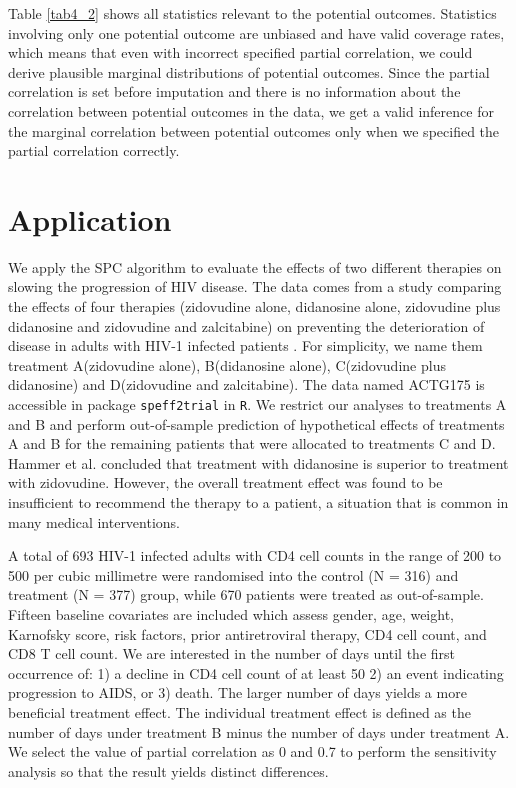 	Table \ref{tab4_2} shows all statistics relevant to the potential outcomes. Statistics involving only one potential outcome are unbiased and have valid coverage rates, which means that even with incorrect specified partial correlation, we could derive plausible marginal distributions of potential outcomes. Since the partial correlation is set before imputation and there is no information about the correlation between potential outcomes in the data, we get a valid inference for the marginal correlation between potential outcomes only when we specified the partial correlation correctly.    
	
	\section{Application}
	\label{sec:4.6}
	We apply the SPC algorithm to evaluate the effects of two different therapies on slowing the progression of HIV disease. The data comes from a study comparing the effects of four therapies (zidovudine alone, didanosine alone, zidovudine plus didanosine and zidovudine and zalcitabine) on preventing the deterioration of disease in adults with HIV-1 infected patients \citep{hammer1996trial}. For simplicity, we name them treatment A(zidovudine alone), B(didanosine alone), C(zidovudine plus didanosine) and D(zidovudine and zalcitabine). The data named ACTG175 is accessible in package \texttt{speff2trial} in \texttt{R}. We restrict our analyses to treatments A and B and perform out-of-sample prediction of hypothetical effects of treatments A and B for the remaining patients that were allocated to treatments C and D. Hammer et al. concluded that treatment with didanosine is superior to treatment with zidovudine. However, the overall treatment effect was found to be insufficient to recommend the therapy to a patient, a situation that is common in many medical interventions. 
	
	A total of 693 HIV-1 infected adults with CD4 cell counts in the range of 200 to 500 per cubic millimetre were randomised into the control (N = 316) and treatment (N = 377) group, while 670 patients were treated as out-of-sample. Fifteen baseline covariates are included which assess gender, age, weight, Karnofsky score, risk factors, prior antiretroviral therapy, CD4 cell count, and CD8 T cell count. We are interested in the number of days until the first occurrence of: 1) a decline in CD4 cell count of at least 50 2) an event indicating progression to AIDS, or 3) death. The larger number of days yields a more beneficial treatment effect. The individual treatment effect is defined as the number of days under treatment B minus the number of days under treatment A. We select the value of partial correlation as 0 and 0.7 to perform the sensitivity analysis so that the result yields distinct differences. 
	

